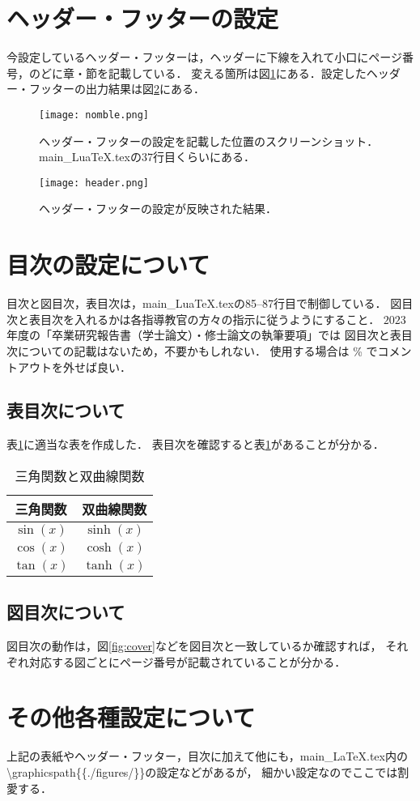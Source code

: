 \section{ヘッダー・フッターの設定}
今設定しているヘッダー・フッターは，ヘッダーに下線を入れて小口にページ番号，のどに章・節を記載している．
変える箇所は図\ref{fig:nomble}にある．設定したヘッダー・フッターの出力結果は図\ref{fig:header}にある．

\begin{figure}[h]
  \centering
  \texttt{[image: nomble.png]}
  \caption{ヘッダー・フッターの設定を記載した位置のスクリーンショット．main\_LuaTeX.texの$37$行目くらいにある．}
  \label{fig:nomble}
\end{figure}
\begin{figure}[h]
  \centering
  \texttt{[image: header.png]}
  \caption{ヘッダー・フッターの設定が反映された結果．}
  \label{fig:header}
\end{figure}


\section{目次の設定について}
目次と図目次，表目次は，main\_LuaTeX.texの85--87行目で制御している．
図目次と表目次を入れるかは各指導教官の方々の指示に従うようにすること．
$2023$年度の「卒業研究報告書（学士論文）・修士論文の執筆要項」では
図目次と表目次についての記載はないため，不要かもしれない．
使用する場合は \% でコメントアウトを外せば良い．

\subsection{表目次について}
表\ref{tab:triangle}に適当な表を作成した．
表目次を確認すると表\ref{tab:triangle}があることが分かる．

\begin{table}[htbp]
  \centering
  \caption{三角関数と双曲線関数}
  \begin{tabular}{cc} \hline 
    三角関数 & 双曲線関数 \\ \hline
    $\sin(x)$ & $\sinh(x)$ \\
    $\cos(x)$ & $\cosh(x)$ \\
    $\tan(x)$ & $\tanh(x)$ \\ \hline
  \end{tabular}
  \label{tab:triangle}
\end{table}


\subsection{図目次について}
図目次の動作は，図\ref{fig:cover}などを図目次と一致しているか確認すれば，
それぞれ対応する図ごとにページ番号が記載されていることが分かる．


\section{その他各種設定について}
上記の表紙やヘッダー・フッター，目次に加えて他にも，main\_LaTeX.tex内の
\textbackslash graphicspath\{\{./figures/\}\}の設定などがあるが，
細かい設定なのでここでは割愛する．
